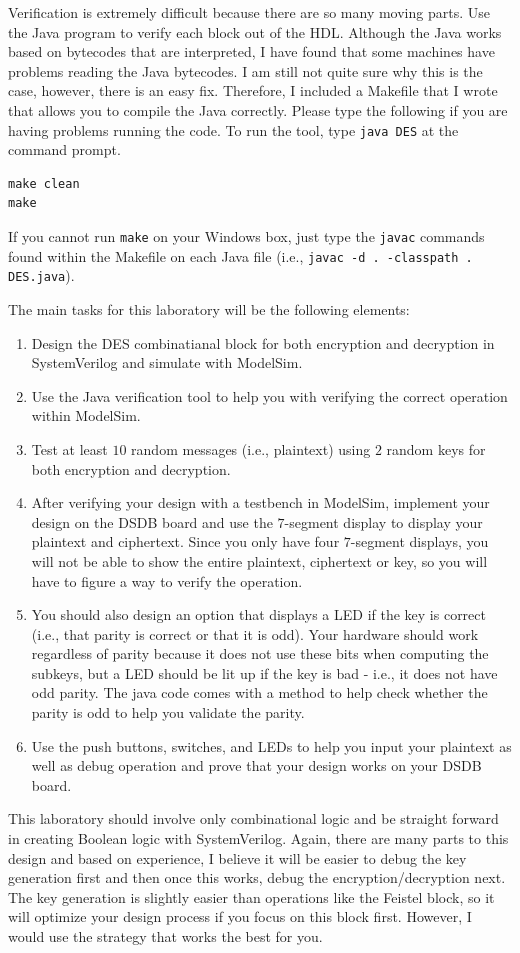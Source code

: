\documentclass{article}
\begin{document}
Verification is extremely difficult
because there are so many moving parts.  Use the
Java program to verify each block out of the HDL.  Although the Java
works based on bytecodes that are interpreted, I have found that some
machines have problems reading the Java bytecodes.  I am still not
quite sure why this is the case, however, there is an easy fix.
Therefore, I included a
Makefile that I wrote that allows you to compile the Java correctly.
Please type the following if you are having problems running the
code.  To run the tool, type \verb!java DES! at the command prompt.
\begin{verbatim}
make clean
make
\end{verbatim}
If you cannot run \verb!make! on your Windows box, just type the
\verb!javac! commands found within the Makefile on each Java file
(i.e., \verb!javac -d . -classpath . DES.java!).  

The main tasks for this laboratory
will be the following elements:
\begin{enumerate}
  \item Design the DES combinatianal block for both encryption and
    decryption in SystemVerilog and simulate with ModelSim.
  \item Use the Java verification tool to help you with verifying the
    correct operation within ModelSim.
  \item Test at least $10$ random messages (i.e., plaintext) using
    $2$ random keys for both encryption and decryption.
  \item After verifying your design with a testbench in ModelSim,
    implement your design on the DSDB board and use the    
    $7$-segment display to display your plaintext and ciphertext.
    Since you only have four $7$-segment displays, you will not be
    able to show the entire plaintext, ciphertext or key, so you will
    have to figure a way to verify the operation.
  \item You should also design an option that displays a LED if the
      key is correct (i.e., that parity is correct or that it is
      odd).  Your hardware should work regardless of parity because it
      does not use these bits when computing the subkeys, but a LED
      should be lit up if the key is bad - i.e., it does not have odd
      parity.  The java code comes with a method to help check whether
      the parity is odd to help you validate the parity.
  \item Use the push buttons, switches, and LEDs to help you input
    your plaintext as well as debug operation and prove that your
    design works on your DSDB board.
\end{enumerate}
This laboratory should involve only combinational logic and be
straight forward in creating Boolean logic with SystemVerilog.
Again, there are many parts to this design and based on experience, I
believe it will be easier to debug the key generation first and then
once this works, debug the encryption/decryption next.  The key
generation is slightly easier than operations like the Feistel block,
so it will optimize your design process if you focus on this block
first.  However, I would use the strategy that works the best for you.
\end{document}
